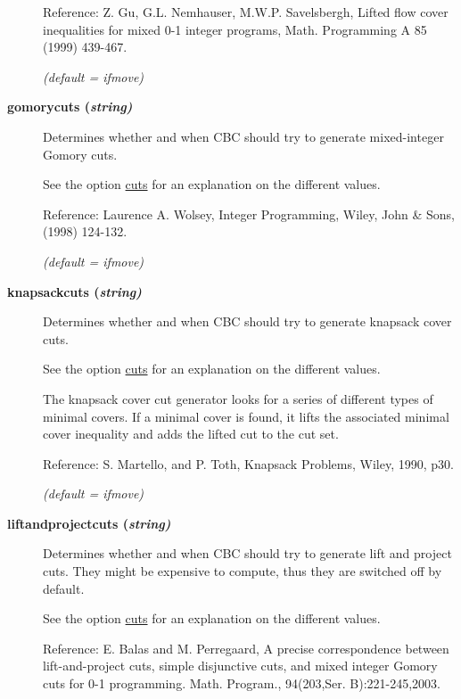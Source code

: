 \begin{description}
Reference: Z. Gu, G.L. Nemhauser, M.W.P. Savelsbergh, Lifted flow cover inequalities for mixed 0-1 integer programs, Math. Programming A 85 (1999) 439-467.

\textsl{(default = ifmove)}

\item[\label{gomorycuts}\hypertarget{gomorycuts}
{\textbf{gomorycuts (\slshape{string})}}]\hspace{1.0in}

Determines whether and when CBC should try to generate mixed-integer Gomory cuts.

See the option \hyperlink{cuts}{cuts} for an explanation on the different values.

Reference: Laurence A. Wolsey, Integer Programming, Wiley, John \& Sons, (1998) 124-132.

\textsl{(default = ifmove)}

\item[\label{knapsackcuts}\hypertarget{knapsackcuts}
{\textbf{knapsackcuts (\slshape{string})}}]\hspace{1.0in}

Determines whether and when CBC should try to generate knapsack cover cuts.

See the option \hyperlink{cuts}{cuts} for an explanation on the different values.

The knapsack cover cut generator looks for a series of different types of minimal covers.
If a minimal cover is found, it lifts the associated minimal cover inequality and adds the lifted cut to the cut set.

Reference: S. Martello, and P. Toth, Knapsack Problems, Wiley, 1990, p30.

\textsl{(default = ifmove)}

\item[\label{liftandprojectcuts}\hypertarget{liftandprojectcuts}
{\textbf{liftandprojectcuts (\slshape{string})}}]\hspace{1.0in}

Determines whether and when CBC should try to generate lift and project cuts.
They might be expensive to compute, thus they are switched off by default.

See the option \hyperlink{cuts}{cuts} for an explanation on the different values.

Reference: E. Balas and M. Perregaard, A precise correspondence between lift-and-project cuts, simple disjunctive cuts, and mixed integer Gomory cuts for 0-1 programming. Math. Program., 94(203,Ser. B):221-245,2003.


\end{description}
